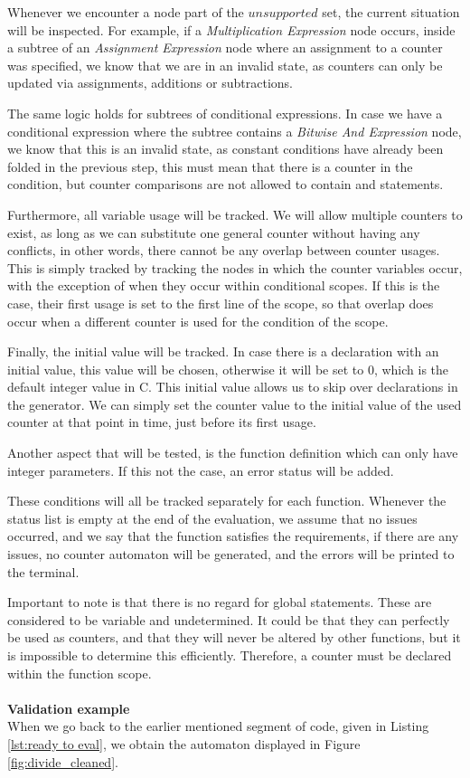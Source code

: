 \documentclass[12pt]{article}
\begin{document}
Whenever we encounter a node part of the $unsupported$ set, the current situation will be inspected. For example, if a \textit{Multiplication Expression} node occurs, inside a subtree of an \textit{Assignment Expression} node where an assignment to a counter was specified, we know that we are in an invalid state, as counters can only be updated via assignments, additions or subtractions. 

The same logic holds for subtrees of conditional expressions. In case we have a conditional expression where the subtree contains a \textit{Bitwise And Expression} node, we know that this is an invalid state, as constant conditions have already been folded in the previous step, this must mean that there is a counter in the condition, but counter comparisons are not allowed to contain and statements.

Furthermore, all variable usage will be tracked. We will allow multiple counters to exist, as long as we can substitute one general counter without having any conflicts, in other words, there cannot be any overlap between counter usages. This is simply tracked by tracking the nodes in which the counter variables occur, with the exception of when they occur within conditional scopes. If this is the case, their first usage is set to the first line of the scope, so that overlap does occur when a different counter is used for the condition of the scope. 

Finally, the initial value will be tracked. In case there is a declaration with an initial value, this value will be chosen, otherwise it will be set to 0, which is the default integer value in C. This initial value allows us to skip over declarations in the generator. We can simply set the counter value to the initial value of the used counter at that point in time, just before its first usage.

Another aspect that will be tested, is the function definition which can only have integer parameters. If this not the case, an error status will be added.

These conditions will all be tracked separately for each function. Whenever the status list is empty at the end of the evaluation, we assume that no issues occurred, and we say that the function satisfies the requirements, if there are any issues, no counter automaton will be generated, and the errors will be printed to the terminal.

Important to note is that there is no regard for global statements. These are considered to be variable and undetermined. It could be that they can perfectly be used as counters, and that they will never be altered by other functions, but it is impossible to determine this efficiently. Therefore, a counter must be declared within the function scope.\\
\\
\noindent
\textbf{Validation example}\\
When we go back to the earlier mentioned segment of code, given in Listing \ref{lst:ready to eval}, we obtain the automaton displayed in Figure \ref{fig:divide_cleaned}.
\end{document}
